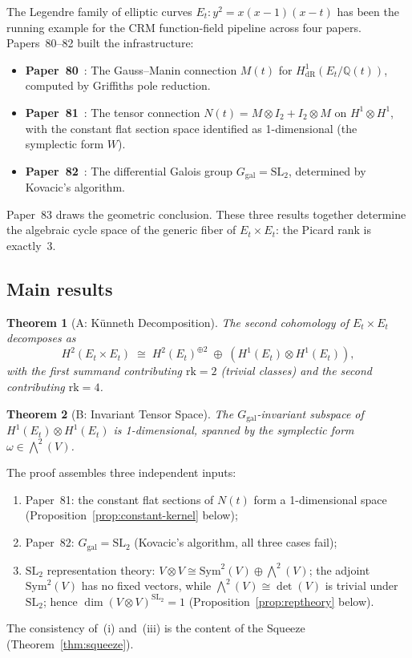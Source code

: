 \documentclass[11pt]{article}
\theoremstyle{plain}
\newtheorem{theorem}{Theorem}[section]
\theoremstyle{definition}
\theoremstyle{remark}
\newcommand{\Q}{\mathbb{Q}}
\newcommand{\SL}{\mathrm{SL}}
\newcommand{\rk}{\mathrm{rk}}
\newcommand{\Ggal}{G_{\mathrm{gal}}}
\begin{document}
The Legendre family of elliptic curves $E_t : y^2 = x(x-1)(x-t)$ has been the running example for the CRM function-field pipeline across four papers.
Papers~80--82 built the infrastructure:
\begin{itemize}
  \item \textbf{Paper~80}~\cite{Lee2026P80}: The Gauss--Manin connection $M(t)$ for $H^1_{\mathrm{dR}}(E_t/\Q(t))$, computed by Griffiths pole reduction.
  \item \textbf{Paper~81}~\cite{Lee2026P81}: The tensor connection $N(t) = M \otimes I_2 + I_2 \otimes M$ on $H^1 \otimes H^1$, with the constant flat section space identified as 1-dimensional (the symplectic form $W$).
  \item \textbf{Paper~82}~\cite{Lee2026P82}: The differential Galois group $\Ggal = \SL_2$, determined by Kovacic's algorithm.
\end{itemize}

Paper~83 draws the geometric conclusion.
These three results together determine the algebraic cycle space of the generic fiber of $E_t \times E_t$: the Picard rank is exactly~3.

\subsection{Main results}

\begin{theorem}[A: K\"unneth Decomposition]\label{thm:A}
The second cohomology of $E_t \times E_t$ decomposes as
\[
  H^2(E_t \times E_t) \;\cong\; H^2(E_t)^{\oplus 2} \;\oplus\; (H^1(E_t) \otimes H^1(E_t)),
\]
with the first summand contributing $\rk = 2$ (trivial classes) and the second contributing $\rk = 4$.
\end{theorem}

\begin{theorem}[B: Invariant Tensor Space]\label{thm:B}
The $\Ggal$-invariant subspace of $H^1(E_t) \otimes H^1(E_t)$ is 1-dimensional, spanned by the symplectic form $\omega \in \bigwedge^2(V)$.
\end{theorem}

The proof assembles three independent inputs:
\begin{enumerate}[label=(\roman*)]
  \item Paper~81: the constant flat sections of $N(t)$ form a 1-dimensional space (Proposition~\ref{prop:constant-kernel} below);
  \item Paper~82: $\Ggal = \SL_2$ (Kovacic's algorithm, all three cases fail);
  \item $\SL_2$ representation theory: $V \otimes V \cong \mathrm{Sym}^2(V) \oplus \bigwedge^2(V)$; the adjoint $\mathrm{Sym}^2(V)$ has no fixed vectors, while $\bigwedge^2(V) \cong \det(V)$ is trivial under $\SL_2$; hence $\dim(V \otimes V)^{\SL_2} = 1$ (Proposition~\ref{prop:reptheory} below).
\end{enumerate}
The consistency of~(i) and~(iii) is the content of the Squeeze
(Theorem~\ref{thm:squeeze}).
\end{document}
